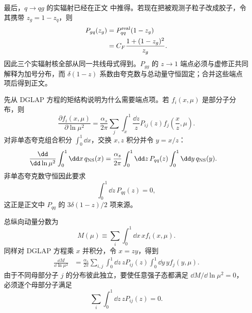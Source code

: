 \begin{derivation}
最后，$q\to qg$ 的实辐射已经在正文 中推得。若现在把被观测子粒子改成胶子，令其携带 $z_g=1-z_q$，则
\begin{align*}
 P_{gq}(z_g)
 &=P_{qq}^{\rm real}(1-z_g)\\
 &=C_F\frac{1+(1-z_g)^2}{z_g}.
\end{align*}
因此三个实辐射核全部从同一共线母式得到。$P_{gg}$ 的 $z\to1$ 端点必须与虚修正共同解释为加号分布，而 $\delta(1-z)$ 系数由夸克数与总动量守恒固定；合并这些端点项后得到正文。
\end{derivation}

\begin{derivation}
先从 DGLAP 方程的矩结构说明为什么需要端点项。若 $f_i(x,\mu)$ 是部分子分布，则
\begin{equation*}
 \frac{\partial f_i(x,\mu)}{\partial\ln\mu^2}
 =\frac{\alpha_s}{2\pi}
 \sum_j\int_x^1\frac{\dd z}{z}
 P_{ij}(z)f_j\!\left(\frac{x}{z},\mu\right).
\end{equation*}
对非单态夸克组合积分 $\int_0^1\dd x$，交换 $x,z$ 积分并令 $y=x/z$：
\begin{align*}
 \frac{\dd}{\dd\ln\mu^2}\int_0^1\dd x\,q_{\rm NS}(x)
 &=\frac{\alpha_s}{2\pi}
 \int_0^1\dd z\,P_{qq}(z)
 \int_0^1\dd y\,q_{\rm NS}(y).
\end{align*}
非单态夸克数守恒因此要求
\begin{equation*}
 \int_0^1\dd z\,P_{qq}(z)=0,
\end{equation*}
这正是正文中 $P_{qq}$ 的 $3\delta(1-z)/2$ 项来源。

总纵向动量分数为
\begin{equation*}
 M(\mu)\equiv\sum_i\int_0^1\dd x\,x f_i(x,\mu).
\end{equation*}
同样对 DGLAP 方程乘 $x$ 并积分，令 $x=zy$，得到
\begin{align*}
 \frac{\dd M}{\dd\ln\mu^2}
 &=\frac{\alpha_s}{2\pi}
 \sum_{i,j}\int_0^1\dd z\,zP_{ij}(z)
 \int_0^1\dd y\,y f_j(y,\mu).
\end{align*}
由于不同母部分子 $j$ 的分布彼此独立，要使任意强子态都满足 $\dd M/\dd\ln\mu^2=0$，必须逐个母部分子满足
\begin{equation*}
 \sum_i\int_0^1\dd z\,zP_{ij}(z)=0.
\end{equation*}


\end{derivation}

